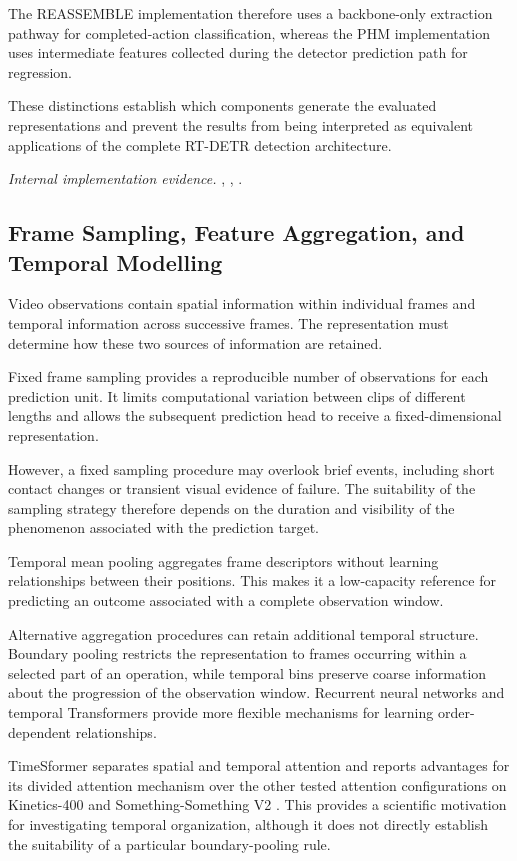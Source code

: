 The REASSEMBLE implementation therefore uses a backbone-only extraction pathway for completed-action classification, whereas the PHM implementation uses intermediate features collected during the detector prediction path for regression.

These distinctions establish which components generate the evaluated representations and prevent the results from being interpreted as equivalent applications of the complete RT-DETR detection architecture.

\noindent\textit{Internal implementation evidence.} , , .

\subsection{Frame Sampling, Feature Aggregation, and Temporal Modelling}

Video observations contain spatial information within individual frames and temporal information across successive frames. The representation must determine how these two sources of information are retained.

Fixed frame sampling provides a reproducible number of observations for each prediction unit. It limits computational variation between clips of different lengths and allows the subsequent prediction head to receive a fixed-dimensional representation.

However, a fixed sampling procedure may overlook brief events, including short contact changes or transient visual evidence of failure. The suitability of the sampling strategy therefore depends on the duration and visibility of the phenomenon associated with the prediction target.

Temporal mean pooling aggregates frame descriptors without learning relationships between their positions. This makes it a low-capacity reference for predicting an outcome associated with a complete observation window.

Alternative aggregation procedures can retain additional temporal structure. Boundary pooling restricts the representation to frames occurring within a selected part of an operation, while temporal bins preserve coarse information about the progression of the observation window. Recurrent neural networks and temporal Transformers provide more flexible mechanisms for learning order-dependent relationships.

TimeSformer separates spatial and temporal attention and reports advantages for its divided attention mechanism over the other tested attention configurations on Kinetics-400 and Something-Something V2 \parencite[Table~1]{P034}. This provides a scientific motivation for investigating temporal organization, although it does not directly establish the suitability of a particular boundary-pooling rule.

